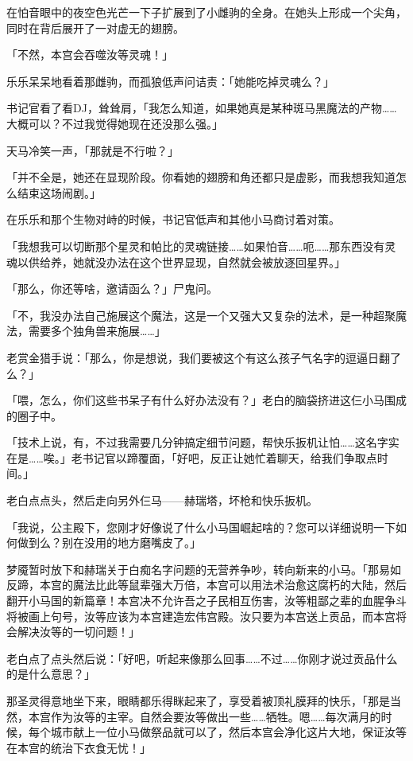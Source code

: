 在怕音眼中的夜空色光芒一下子扩展到了小雌驹的全身。在她头上形成一个尖角，同时在背后展开了一对虚无的翅膀。

「不然，本宫会吞噬汝等灵魂！」

乐乐呆呆地看着那雌驹，而孤狼低声问诘责：「她能吃掉灵魂么？」

书记官看了看DJ，耸耸肩，「我怎么知道，如果她真是某种斑马黑魔法的产物……大概可以？不过我觉得她现在还没那么强。」

天马冷笑一声，「那就是不行啦？」

「并不全是，她还在显现阶段。你看她的翅膀和角还都只是虚影，而我想我知道怎么结束这场闹剧。」

在乐乐和那个生物对峙的时候，书记官低声和其他小马商讨着对策。

「我想我可以切断那个星灵和帕比的灵魂链接……如果怕音……呃……那东西没有灵魂以供给养，她就没办法在这个世界显现，自然就会被放逐回星界。」

「那么，你还等啥，邀请函么？」尸鬼问。

「不，我没办法自己施展这个魔法，这是一个又强大又复杂的法术，是一种超聚魔法，需要多个独角兽来施展……」

老赏金猎手说：「那么，你是想说，我们要被这个有这么孩子气名字的逗逼日翻了么？」

「喂，怎么，你们这些书呆子有什么好办法没有？」老白的脑袋挤进这仨小马围成的圈子中。

「技术上说，有，不过我需要几分钟搞定细节问题，帮快乐扳机让怕……这名字实在是……唉。」老书记官以蹄覆面，「好吧，反正让她忙着聊天，给我们争取点时间。」

老白点点头，然后走向另外仨马——赫瑞塔，坏枪和快乐扳机。

「我说，公主殿下，您刚才好像说了什么小马国崛起啥的？您可以详细说明一下如何做到么？别在没用的地方磨嘴皮了。」

梦魇暂时放下和赫瑞关于白痴名字问题的无营养争吵，转向新来的小马。「那易如反蹄，本宫的魔法比此等鼠辈强大万倍，本宫可以用法术治愈这腐朽的大陆，然后翻开小马国的新篇章！本宫决不允许吾之子民相互伤害，汝等粗鄙之辈的血腥争斗将被画上句号，汝等应该为本宫建造宏伟宫殿。汝只要为本宫送上贡品，而本宫将会解决汝等的一切问题！」

老白点了点头然后说：「好吧，听起来像那么回事……不过……你刚才说过贡品什么的是什么意思？」

那圣灵得意地坐下来，眼睛都乐得眯起来了，享受着被顶礼膜拜的快乐，「那是当然，本宫作为汝等的主宰。自然会要汝等做出一些……牺牲。嗯……每次满月的时候，每个城市献上一位小马做祭品就可以了，然后本宫会净化这片大地，保证汝等在本宫的统治下衣食无忧！」

